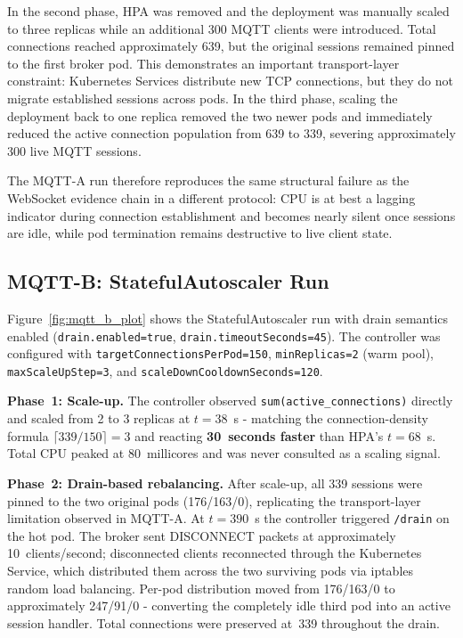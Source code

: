 \documentclass[twocolumn]{svjour3}
\begin{document}
In the second phase, HPA was removed and the deployment was manually scaled to three replicas while an additional 300 MQTT clients were introduced. Total connections reached approximately 639, but the original sessions remained pinned to the first broker pod. This demonstrates an important transport-layer constraint: Kubernetes Services distribute new TCP connections, but they do not migrate established sessions across pods. In the third phase, scaling the deployment back to one replica removed the two newer pods and immediately reduced the active connection population from 639 to 339, severing approximately 300 live MQTT sessions.

The MQTT-A run therefore reproduces the same structural failure as the WebSocket evidence chain in a different protocol: CPU is at best a lagging indicator during connection establishment and becomes nearly silent once sessions are idle, while pod termination remains destructive to live client state.

\subsection{MQTT-B: StatefulAutoscaler Run}

Figure~\ref{fig:mqtt_b_plot} shows the StatefulAutoscaler run with drain semantics enabled (\texttt{drain.enabled=true}, \texttt{drain.timeoutSeconds=45}). The controller was configured with \texttt{targetConnectionsPerPod=150}, \texttt{minReplicas=2} (warm pool), \texttt{maxScaleUpStep=3}, and \texttt{scaleDownCooldownSeconds=120}.

\textbf{Phase~1: Scale-up.} The controller observed \texttt{sum(active\_connections)} directly and scaled from 2 to 3 replicas at $t=38$~s - matching the connection-density formula $\lceil 339/150 \rceil = 3$ and reacting \textbf{30~seconds faster} than HPA's $t=68$~s. Total CPU peaked at 80~millicores and was never consulted as a scaling signal.

\textbf{Phase~2: Drain-based rebalancing.} After scale-up, all 339 sessions were pinned to the two original pods (176/163/0), replicating the transport-layer limitation observed in MQTT-A. At $t=390$~s the controller triggered \texttt{/drain} on the hot pod. The broker sent DISCONNECT packets at approximately 10~clients/second; disconnected clients reconnected through the Kubernetes Service, which distributed them across the two surviving pods via iptables random load balancing. Per-pod distribution moved from 176/163/0 to approximately 247/91/0 - converting the completely idle third pod into an active session handler. Total connections were preserved at~339 throughout the drain.
\end{document}
